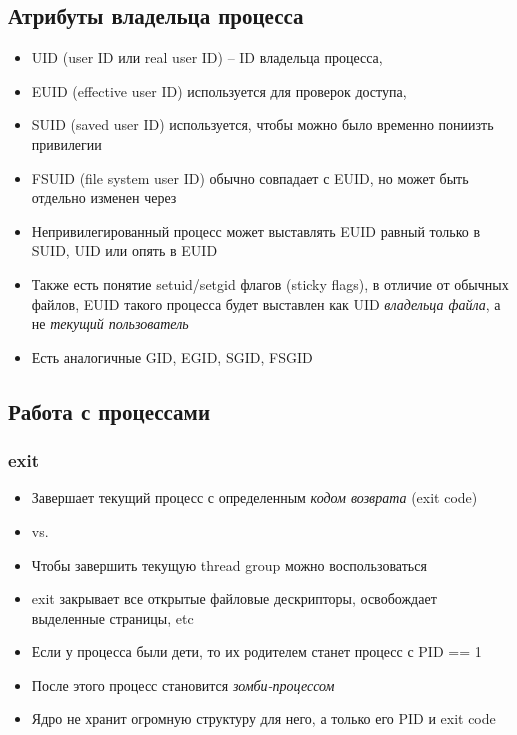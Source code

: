  \subsection{Атрибуты владельца процесса}
    \begin{itemize}
      \item UID (user ID или real user ID) -- ID владельца процесса, 
      \item EUID (effective user ID) используется для проверок доступа, 
      \item SUID (saved user ID) используется, чтобы можно было временно пониизть привилегии
      \item FSUID (file system user ID) обычно совпадает с EUID, но может быть отдельно изменен через 
      \item Непривилегированный процесс может выставлять EUID равный только в SUID, UID или опять в EUID
      \item Также есть понятие setuid/setgid флагов (sticky flags), в отличие от обычных файлов, EUID такого процесса будет выставлен как UID \textit{владельца файла}, а не \textit{текущий пользователь}
      \item Есть аналогичные GID, EGID, SGID, FSGID
    \end{itemize}
  
  \subsection{Работа с процессами}
  \subsubsection{exit}
    \begin{itemize}
      \item Завершает текущий процесс с определенным \textit{кодом возврата} (exit code)
      \item {} vs. 
      \item Чтобы завершить текущую thread group можно воспользоваться 
      \item exit закрывает все открытые файловые дескрипторы, освобождает выделенные страницы, etc
      \item Если у процесса были дети, то их родителем станет процесс с PID == 1
      \item После этого процесс становится \textit{зомби-процессом}
      \item Ядро не хранит огромную структуру для него, а только его PID и exit code
    \end{itemize}
  
